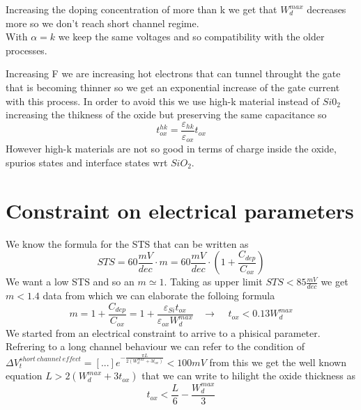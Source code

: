 \vspace{5mm}

Increasing the doping concentration of more than k we get that $W_d^{max}$ decreases more so we don't reach short channel regime.\\
With $\alpha=k$ we keep the same voltages and so compatibility with the older processes.\\

\vspace{5mm}

Increasing F we are increasing hot electrons that can tunnel throught the gate that is becoming thinner so we get an exponential increase of the gate current with this process. In order to avoid this we use high-k material instead of $Si0_2$ increasing the thikness of the oxide but preserving the same capacitance so 
\begin{equation}
t_{ox}^{hk}=\frac{\varepsilon_{hk}}{\varepsilon_{ox}}t_{ox}
\end{equation}
However high-k materials are not so good in terms of charge inside the oxide, spurios states and interface states wrt $SiO_2$.\\ 

\section{Constraint on electrical parameters}

We know the formula for the STS that can be written as
\begin{equation}
STS=60 \frac{mV}{dec} \cdot m =60 \frac{mV}{dec} \cdot (1+\frac{C_{dep}}{C_{ox}})
\end{equation}
We want a low STS and so an $m\simeq 1$. Taking as upper limit $STS<85 \frac{mV}{dec}$ we get $m<1.4$ data from which we can elaborate the folloing formula 
\begin{equation}
m=1+\frac{C_{dep}}{C_{ox}}=1+\frac{\varepsilon_{Si}t_{ox}}{\varepsilon_{ox}W_d^{max}}\ \ \ \ \rightarrow \ \ \ \ \ t_{ox}<0.13W_d^{max}
\end{equation} 
We started from an electrical constraint to arrive to a phisical parameter.\\
\vspace{5mm}
Refrering to a long channel behaviour we can refer to the condition of $\Delta V_t^{short \ channel \ effect}=[...]e^{-\frac{\pi L}{2(W_{d}^{max}+3t_{ox})}}<100mV$ from this we get the well known equation $L>2(W_d^{max}+3t_{ox})$ that we can write to hilight the oxide thickness as 
\begin{equation}
t_{ox}<\frac{L}{6}-\frac{W_{d}^{max}}{3}
\end{equation}
\vspace{5mm}

